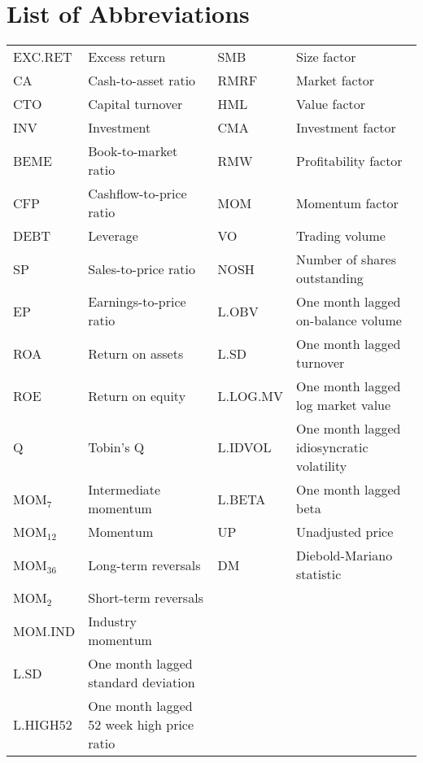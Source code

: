 \documentclass[12pt]{article}
\begin{document}
\section*{List of Abbreviations}
\begin{table}[H] 
\setlength\extrarowheight{10pt}
\begin{tabularx}{\textwidth}{@{\extracolsep{4pt}} l Y l Y} 
EXC.RET & Excess return & SMB & Size factor\\ 
CA & Cash-to-asset ratio & RMRF & Market factor\\
CTO & Capital turnover & HML & Value factor\\
INV & Investment & CMA & Investment factor\\
BEME & Book-to-market ratio & RMW & Profitability factor\\
CFP & Cashflow-to-price ratio & MOM & Momentum factor\\
DEBT & Leverage & VO & Trading volume\\
SP & Sales-to-price ratio & NOSH & Number of shares outstanding\\
EP & Earnings-to-price ratio & L.OBV & One month lagged on-balance volume \\
ROA & Return on assets & L.SD & One month lagged turnover \\
ROE & Return on equity & L.LOG.MV & One month lagged log market value\\
Q & Tobin's Q & L.IDVOL & One month lagged idiosyncratic volatility \\
MOM$_7$ & Intermediate momentum & L.BETA & One month lagged beta\\
MOM$_{12}$ & Momentum & UP & Unadjusted price\\
MOM$_{36}$ & Long-term reversals & DM& Diebold-Mariano statistic\\
MOM$_{2}$ & Short-term reversals & &\\
MOM.IND & Industry momentum & &\\
L.SD & One month lagged standard deviation & &\\
L.HIGH52 & One month lagged 52 week high price ratio & &\\
\end{tabularx}
\end{table} 

\newpage

\end{document}
